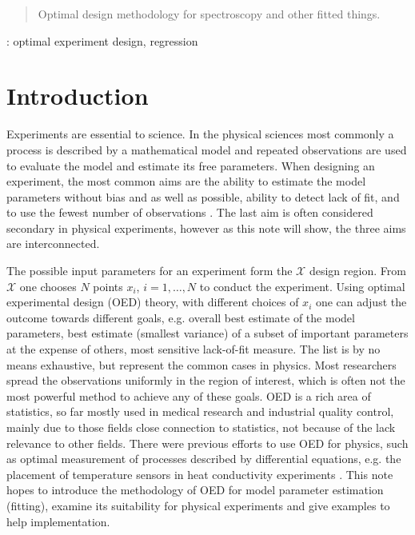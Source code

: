 \documentclass[12pt]{iopart}
\begin{document}
\address{Institute of Atomic and Molecular Sciences, Academia Sinica, Taiwan}
\begin{abstract}
Optimal design methodology for spectroscopy and other fitted things.
\end{abstract}

: optimal experiment design, regression

\pacs{}



\section{Introduction}


Experiments are essential to science. In the physical sciences most commonly a process is described by a mathematical model and repeated observations are used to evaluate the model and estimate its free parameters. When designing an experiment, the most common aims are the ability to estimate the model parameters without bias and as well as possible, ability to detect lack of fit, and to use the fewest number of observations \cite{Box1975,Box1987}. The last aim is often considered secondary in physical experiments, however as this note will show, the three aims are interconnected.

The possible input parameters for an experiment form the $\mathcal{X}$ design region. From $\mathcal{X}$ one chooses $N$ points $x_i$, $i = 1, \ldots, N$ to conduct the experiment. Using optimal experimental design (OED) theory, with different choices of $x_i$ one can adjust the outcome towards different goals, e.g. overall best estimate of the model parameters, best estimate (smallest variance) of a subset of important parameters at the expense of others, most sensitive lack-of-fit measure. The list is by no means exhaustive, but represent the common cases in physics. Most researchers spread the observations uniformly in the region of interest, which is often not the most powerful method to achieve any of these goals. OED is a rich area of statistics, so far mostly used in medical research and industrial quality control, mainly due to those fields close connection to statistics, not because of the lack relevance to other fields. There were previous efforts to use OED for physics, such as optimal measurement of processes described by differential equations, e.g. the placement of temperature sensors in heat conductivity experiments \cite{Emery1998}. This note hopes to introduce the methodology of OED for model parameter estimation (fitting), examine its suitability for physical experiments and give examples to help implementation.
\end{document}
